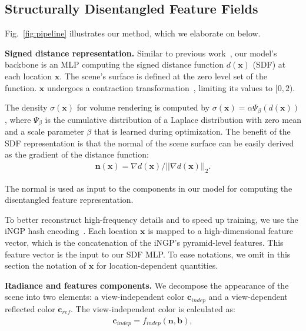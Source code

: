 \subsection{Structurally Disentangled Feature Fields}
Fig.~\ref{fig:pipeline} illustrates our method, which we elaborate on below. 



\smallskip
\noindent \textbf{Signed distance representation.} Similar to previous work~\cite{wang2023unisdf}, our model's backbone is an MLP computing the signed distance function $d(\mathbf{x})$ (SDF) at each location $\mathbf{x}$. The scene's surface is defined at the zero level set of the function. 
$\mathbf{x}$ undergoes a contraction transformation~\cite{barron2022mipnerf360, wang2023unisdf}, limiting its values to $[0, 2)$.

The density $\sigma(\mathbf{x})$ for volume rendering is computed by $\sigma(\mathbf{x}) = \alpha \Psi_\beta(d(\mathbf{x}))$, where $\Psi_\beta$ is the cumulative distribution of a Laplace distribution with zero mean and a scale parameter $\beta$ that is learned during optimization. The benefit of the SDF representation is that the normal of the scene surface can be easily derived as the gradient of the distance function:
\begin{align} \label{eq:normal}
\mathbf{n}(\mathbf{x}) = \nabla d(\mathbf{x}) / || \nabla d(\mathbf{x}) ||_2.
\end{align}

\noindent The normal is used as input to the components in our model for computing the disentangled feature representation. 

To better reconstruct high-frequency details and to speed up training, we use the iNGP hash encoding~\cite{muller2022instant}. Each location $\mathbf{x}$ is mapped to a high-dimensional feature vector, which is the concatenation of the iNGP's pyramid-level features. This feature vector is the input to our SDF MLP. To ease notations, we omit in this section the notation of $\mathbf{x}$ for location-dependent quantities.

\smallskip
\noindent \textbf{Radiance and features components.} We decompose the appearance of the scene into two elements: a view-independent color $\mathbf{c}_{indep}$ and a view-dependent reflected color $\mathbf{c}_{ref}$. The view-independent color is calculated as:
\begin{align} \label{eq:c_indep}
\mathbf{c}_{indep} = f_{indep}(\mathbf{n}, \mathbf{b}),
\end{align}

